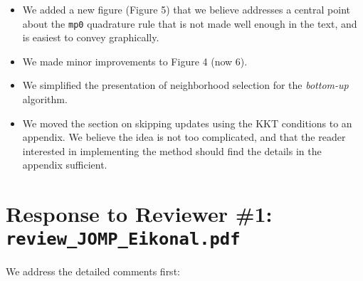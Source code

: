 \documentclass{article}
\begin{document}
\begin{itemize}
\item We added a new figure (Figure 5) that we believe addresses a
  central point about the \texttt{mp0} quadrature rule that is not
  made well enough in the text, and is easiest to convey graphically.

\item We made minor improvements to Figure 4 (now 6).

\item We simplified the presentation of neighborhood selection for the
  \emph{bottom-up} algorithm.

\item We moved the section on skipping updates using the KKT
  conditions to an appendix. We believe the idea is not too
  complicated, and that the reader interested in implementing the
  method should find the details in the appendix sufficient.

\end{itemize}

\vspace{1em}

\section*{Response to Reviewer \#1: \texttt{review\_JOMP\_Eikonal.pdf}}

We address the detailed comments first:
\end{document}
